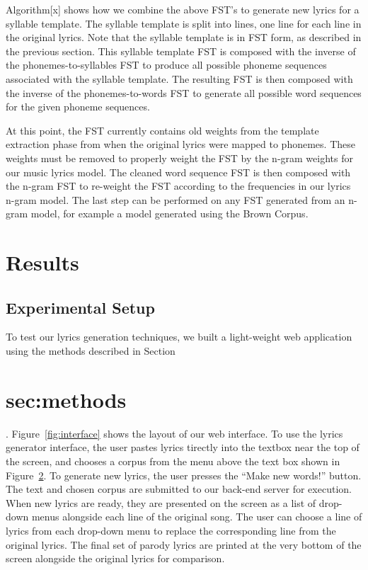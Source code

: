 \documentclass{vgtc}                          %
\begin{document}
Algorithm[x] shows how we combine the above FST's to generate
new lyrics for a syllable template. The syllable template
is split into lines, one line for each line in the original
lyrics. Note that the syllable template is in FST form, as
described in the previous section. This syllable template
FST is composed with the inverse of the phonemes-to-syllables
FST to produce all possible phoneme sequences associated
with the syllable template. The resulting FST is then
composed with the inverse of the phonemes-to-words FST
to generate all possible word sequences for the given
phoneme sequences.

At this point, the FST currently contains
old weights from the template extraction phase from when
the original lyrics were mapped to phonemes. These weights
must be removed to properly weight the FST by the n-gram
weights for our music lyrics model. The cleaned word sequence FST
is then composed with the n-gram FST to re-weight
the FST according to the frequencies in our lyrics n-gram model.
The last step can be performed on any FST generated from an n-gram
model, for example a model generated using the Brown Corpus.

\section{Results}
\label{sec:results}

\subsection{Experimental Setup}
To test our lyrics generation techniques, we built a light-weight
web application using the methods described in Section~\section{sec:methods}.
Figure~\ref{fig:interface} shows the layout of our web interface.
To use the lyrics generator interface, the user pastes lyrics tirectly
into the textbox near the top of the screen, and chooses a corpus
from the menu above the text box shown in Figure~\ref{}. To generate new lyrics, the user
presses the ``Make new words!'' button. The text and chosen
corpus are submitted to our back-end server for execution. When
new lyrics are ready, they are presented on the screen as a
list of drop-down menus alongside each line of the original song.
The user can choose a line of lyrics from each drop-down menu to replace
the corresponding line from the original lyrics.
The final set of parody lyrics are printed at the very bottom of the screen
alongside the original lyrics for comparison.
\end{document}
